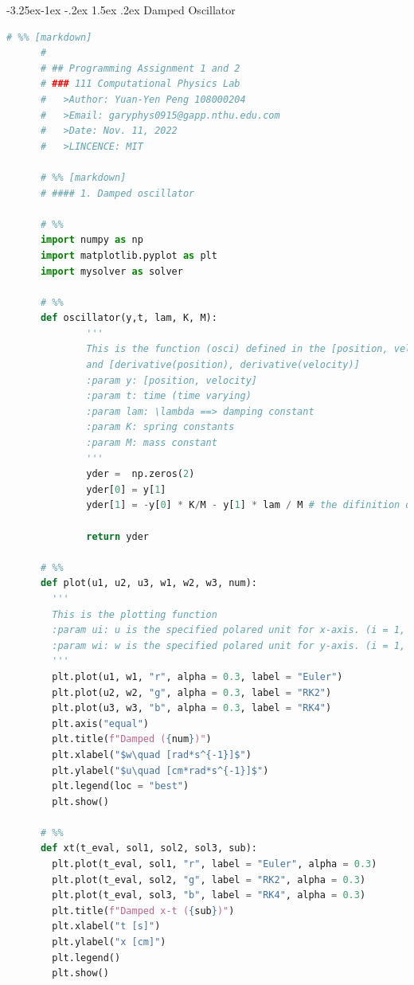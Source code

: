 \documentclass[12pt]{article}
\makeatletter
\renewcommand\subsection{\leftskip 0pt\@startsection{subsection}{2}{\z@}%
                                      {-3.25ex\@plus -1ex \@minus -.2ex}%
                                      {1.5ex \@plus .2ex}%
                                      {\normalfont\large\bfseries}}
\makeatother
\begin{document}
    \subsection{Damped Oscillator}
      \begin{lstlisting}[language={Python}]
      # %% [markdown]
      # 
      # ## Programming Assignment 1 and 2
      # ### 111 Computational Physics Lab  
      #   >Author: Yuan-Yen Peng 108000204  
      #   >Email: garyphys0915@gapp.nthu.edu.com  
      #   >Date: Nov. 11, 2022  
      #   >LINCENCE: MIT

      # %% [markdown]
      # #### 1. Damped oscillator

      # %%
      import numpy as np
      import matplotlib.pyplot as plt
      import mysolver as solver

      # %%
      def oscillator(y,t, lam, K, M):
              '''
              This is the function (osci) defined in the [position, velocity] 
              and [derivative(position), derivative(velocity)]
              :param y: [position, velocity]
              :param t: time (time varying)
              :param lam: \lambda ==> damping constant
              :param K: spring constants
              :param M: mass constant
              '''
              yder =  np.zeros(2)
              yder[0] = y[1]
              yder[1] = -y[0] * K/M - y[1] * lam / M # the difinition of the acceleration, omghich is depend on the position.
              
              return yder

      # %%
      def plot(u1, u2, u3, w1, w2, w3, num):
        '''
        This is the plotting function
        :param ui: u is the specified polared unit for x-axis. (i = 1, 2, 3) ==> (Euler, RK2, RK4)
        :param wi: w is the specified polared unit for y-axis. (i = 1, 2, 3) ==> (Euler, RK2, RK4)
        '''
        plt.plot(u1, w1, "r", alpha = 0.3, label = "Euler")
        plt.plot(u2, w2, "g", alpha = 0.3, label = "RK2")
        plt.plot(u3, w3, "b", alpha = 0.3, label = "RK4")
        plt.axis("equal")
        plt.title(f"Damped ({num})")
        plt.xlabel("$w\quad [rad*s^{-1}]$")
        plt.ylabel("$u\quad [cm*rad*s^{-1}]$")
        plt.legend(loc = "best")
        plt.show()

      # %%
      def xt(t_eval, sol1, sol2, sol3, sub):
        plt.plot(t_eval, sol1, "r", label = "Euler", alpha = 0.3)
        plt.plot(t_eval, sol2, "g", label = "RK2", alpha = 0.3)
        plt.plot(t_eval, sol3, "b", label = "RK4", alpha = 0.3)
        plt.title(f"Damped x-t ({sub})")
        plt.xlabel("t [s]")
        plt.ylabel("x [cm]")
        plt.legend()
        plt.show()
        

\end{lstlisting}
\end{document}
